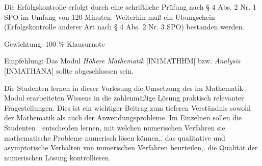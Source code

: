 \begin{course}

\setdoclanguagegerman
{}



\coursehead


\label{cour_7197.dp_997}


\begin{styleenv}
\begin{assessment}
Die Erfolgskontrolle erfolgt durch eine schriftliche Prüfung nach § 4 Abs. 2 Nr. 1 SPO im Umfang von 120 Minuten. Weiterhin muß ein Übungschein (Erfolgskontrolle anderer Art nach § 4 Abs. 2 Nr. 3 SPO) bestanden werden.

 

Gewichtung: 100 \% Klausurnote


\end{assessment}

\begin{conditions}Empfehlung: Das Modul \emph{Höhere Mathematik} [IN1MATHHM] bzw. \emph{Analysis} [INMATHANA] sollte abgeschlossen sein.

\end{conditions}


\end{styleenv}

\begin{learningoutcomes}
Die Studenten lernen in dieser Vorlesung die Umsetzung des im Mathematik-Modul erarbeiteten Wissens in die zahlenmäßige Lösung praktisch relevanter Fragestellungen. Dies ist ein wichtiger Beitrag zum tieferen Verständnis sowohl der Mathematik als auch der Anwendungsprobleme. \newline
\newline
Im Einzelnen sollen die Studenten\newline
{}. entscheiden lernen, mit welchen numerischen Verfahren sie mathematische Probleme numerisch lösen können,. das qualitative und asymptotische Verhalten von numerischen Verfahren beurteilen,. die Qualität der numerischen Lösung kontrollieren.



\end{learningoutcomes}
\end{course}

